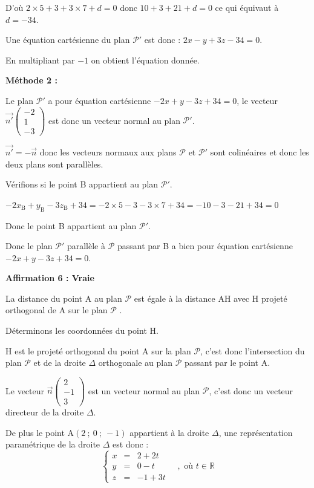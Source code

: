 \documentclass[10pt]{article}
\providecommand{\R}{\mathbb{R}}
\providecommand{\vect}[1]{\overrightarrow{#1}}
\begin{document}
D'où $2 \times 5 +3 +3 \times 7 +d=0$ donc $10+3+21+d = 0$ ce qui équivaut à $d=-34 $.

Une équation cartésienne du plan $\mathcal{P}'$ est donc : $2x-y+3z-34=0$.

En multipliant par $-1$ on obtient l'équation donnée.

\smallskip

\textbf{Méthode 2 :}

Le plan $\mathcal{P}'$ a pour équation cartésienne $-2x + y - 3z + 34 = 0$, le vecteur $\vect{n'}\begin{pmatrix}-2\\1\\-3\end{pmatrix}$ est donc un vecteur normal au plan $\mathcal{P}'$.

$\vect{n'}=-\vect{n}$ donc les vecteurs normaux aux plans $\mathcal{P}$ et $\mathcal{P}'$ sont colinéaires et donc les deux plans sont parallèles.

Vérifions si le point B appartient au plan  $\mathcal{P}'$.

$-2x_{\mathrm{B}} + y_{\mathrm{B}} - 3z_{\mathrm{B}} + 34 = -2 \times 5 -3 -3 \times 7 +34 = -10-3-21+34 = 0$

Donc le point B appartient au plan  $\mathcal{P}'$.

Donc le plan $\mathcal{P}'$ parallèle à $\mathcal{P}$ passant par B a bien pour équation cartésienne \linebreak$-2x + y - 3z + 34 = 0$.

\textbf{Affirmation 6 : Vraie}

 La distance du point A au plan $\mathcal{P}$ est égale à la distance AH avec H projeté orthogonal de A sur le plan $\mathcal{P}$ .

Déterminons les coordonnées du point H.

H est le projeté orthogonal du point A sur la plan $\mathcal{P}$, c'est donc l'intersection du plan $\mathcal{P}$ et de la droite $\Delta$ orthogonale au plan $\mathcal{P}$ passant par le point A.

Le vecteur $\vect{n}\begin{pmatrix}2\\-1\\3\end{pmatrix}$ est un vecteur normal au plan $\mathcal{P}$, c'est donc un vecteur directeur de la droite $\Delta$.

De plus le point A$(2~;~0~;~-1)$ appartient à la droite $\Delta$, une représentation paramétrique de la droite $\Delta$ est donc :
\[\left\{\begin{array}{lcl}
x&=&2+2t \\
y&=&0 -t \\
z&=&-1+3t
\end{array} \quad, \text { où } t \in \R\right.\]
\end{document}
